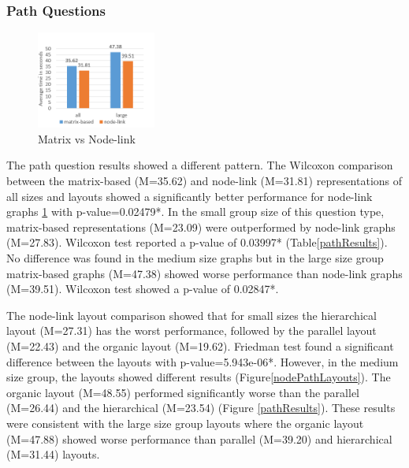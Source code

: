 \documentclass{l4proj}
\begin{document}
\subsubsection{Path Questions}

\begin{figure}
	\centering
	\vspace{-10mm}
    \includegraphics[width=0.35\textwidth]{images/pathComparison.PNG}
    \caption{Matrix vs Node-link} 
	\label{pathComparison}
\end{figure}

The path question results showed a different pattern. The Wilcoxon comparison between the matrix-based (M=35.62) and node-link (M=31.81) representations of all sizes and layouts showed a significantly better performance for node-link graphs \ref{pathComparison} with p-value=0.02479*. In the small group size of this question type, matrix-based representations (M=23.09) were outperformed by node-link graphs (M=27.83). Wilcoxon test reported a p-value of 0.03997* (Table\ref{pathResults}). No difference was found in the medium size graphs but in the large size group matrix-based graphs (M=47.38) showed worse performance than node-link graphs (M=39.51). Wilcoxon test showed a p-value of 0.02847*. 

The node-link layout comparison showed that for small sizes the hierarchical layout (M=27.31) has the worst performance, followed by the parallel layout (M=22.43) and the organic layout (M=19.62). Friedman test found a significant difference between the layouts with p-value=5.943e-06*. However, in the medium size group, the layouts showed different results (Figure\ref{nodePathLayouts}). The organic layout (M=48.55) performed significantly worse than the parallel (M=26.44) and the hierarchical (M=23.54) (Figure \ref{pathResults}). These results were consistent with the large size group layouts where the organic layout (M=47.88) showed worse performance than parallel (M=39.20) and hierarchical (M=31.44) layouts.
\end{document}
